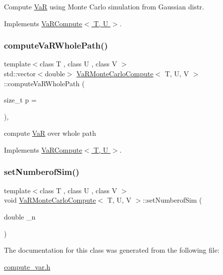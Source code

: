 Compute \hyperlink{classVaR}{VaR} using Monte Carlo simulation from Gaussian distr. 



Implements \hyperlink{classVaRCompute_a0465221010d248238fe1052958776984}{Va\+R\+Compute$<$ T, U $>$}.

\hypertarget{classVaRMonteCarloCompute_a14ea83586172f23f8bb4a60babeb812f}{}\label{classVaRMonteCarloCompute_a14ea83586172f23f8bb4a60babeb812f} 
\subsubsection{\texorpdfstring{compute\+Va\+R\+Whole\+Path()}{computeVaRWholePath()}}
{\footnotesize\ttfamily template$<$class T , class U , class V $>$ \\
std\+::vector$<$double$>$ \hyperlink{classVaRMonteCarloCompute}{Va\+R\+Monte\+Carlo\+Compute}$<$ T, U, V $>$\+::compute\+Va\+R\+Whole\+Path (\begin{DoxyParamCaption}\item[{size\+\_\+t}]{p = {} }\end{DoxyParamCaption})\hspace{0.3cm}{\ttfamily [inline]}, {\ttfamily [virtual]}}



compute \hyperlink{classVaR}{VaR} over whole path 



Implements \hyperlink{classVaRCompute_ad5ec9feb42ea2f99f2c91e793d18fe1b}{Va\+R\+Compute$<$ T, U $>$}.

\hypertarget{classVaRMonteCarloCompute_a3ef6b8ac6e54e0dc4cc8239926d8f236}{}\label{classVaRMonteCarloCompute_a3ef6b8ac6e54e0dc4cc8239926d8f236} 
\subsubsection{\texorpdfstring{set\+Numberof\+Sim()}{setNumberofSim()}}
{\footnotesize\ttfamily template$<$class T , class U , class V $>$ \\
void \hyperlink{classVaRMonteCarloCompute}{Va\+R\+Monte\+Carlo\+Compute}$<$ T, U, V $>$\+::set\+Numberof\+Sim (\begin{DoxyParamCaption}\item[{double}]{\+\_\+n }\end{DoxyParamCaption})\hspace{0.3cm}{\ttfamily [inline]}}



The documentation for this class was generated from the following file\+:\begin{DoxyCompactItemize}
\item 
\hyperlink{compute__var_8h}{compute\+\_\+var.\+h}\end{DoxyCompactItemize}
